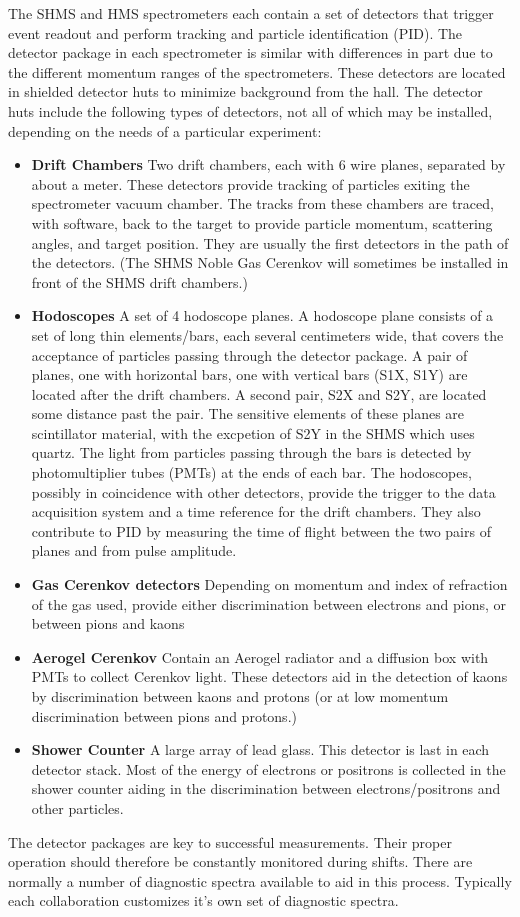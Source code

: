 The SHMS and HMS spectrometers each contain a set of detectors that
trigger event readout and perform tracking and particle identification
(PID).  The detector package in each spectrometer is similar with
differences in part due to the different momentum ranges of the
spectrometers.  These detectors are located in shielded detector huts
to minimize background from the hall.  The detector huts include the
following types of detectors, not all of which may be installed,
depending on the needs of a particular experiment:
\begin{itemize}
\item[]\textbf{Drift Chambers} Two drift chambers, each with 6 wire planes,
separated by about a meter.  These detectors provide tracking of
particles exiting the spectrometer vacuum chamber.  The tracks from
these chambers are traced, with software, back to the target to
provide particle momentum, scattering
angles, and target position.  They are usually the first detectors
in the path of the detectors.  (The SHMS Noble Gas Cerenkov will
sometimes be installed in front of the SHMS drift chambers.)
\item[]\textbf{Hodoscopes} A set of 4 hodoscope planes.  A hodoscope plane
consists of a set of long thin elements/bars, each several centimeters
wide, that covers the acceptance of particles passing through the
detector package.  A pair of planes, one with horizontal bars, one
with vertical bars (S1X, S1Y) are located after the drift chambers.  A
second pair, S2X and S2Y, are located some distance past the pair.
The sensitive elements of these planes are scintillator material, with
the excpetion of S2Y in the SHMS which uses quartz.  The light from
particles passing through the bars is detected by photomultiplier
tubes (PMTs) at the ends of each bar.  The hodoscopes, possibly in
coincidence with other detectors, provide the trigger to the data
acquisition system and a time reference for the drift chambers.
They also contribute to PID by measuring the time of
flight between the two pairs of planes and from pulse amplitude.
\item[]\textbf{Gas Cerenkov detectors} Depending on momentum and index of
refraction of the gas used, provide either discrimination between
electrons and pions, or between pions and kaons
\item[]\textbf{Aerogel Cerenkov} Contain an Aerogel radiator and a diffusion box
  with PMTs to collect Cerenkov light.  These detectors aid in the
  detection of kaons by  discrimination between kaons
and protons (or at low momentum discrimination between pions and
protons.)
\item[]\textbf{Shower Counter} A large array of lead glass.  This detector is
  last in each detector stack.  Most of the energy of electrons or
  positrons is
  collected in the shower counter aiding in the discrimination between
  electrons/positrons and other particles.
\end{itemize}

The detector packages are key to successful measurements.  Their
proper operation should therefore be constantly monitored during
shifts. There are normally a number of diagnostic spectra available to
aid in this process.  Typically each collaboration customizes it's own
set of diagnostic spectra.

